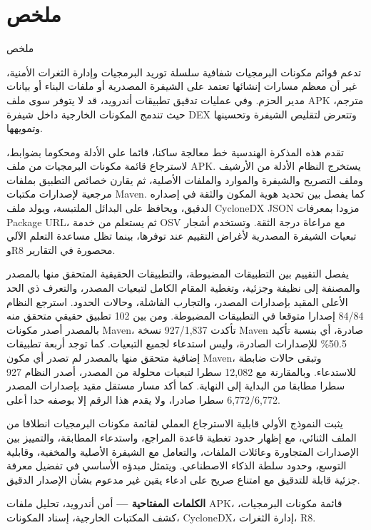 \chapter*{\texorpdfstring{\textarabic{ملخص}}{Arabic Abstract}}
  {\texorpdfstring{\textarabic{ملخص}}{Arabic Abstract}}

\begin{otherlanguage}{arabic}
تدعم قوائم مكونات البرمجيات شفافية سلسلة توريد البرمجيات وإدارة الثغرات
الأمنية، غير أن معظم مسارات إنشائها تعتمد على الشيفرة المصدرية أو ملفات
البناء أو بيانات مدير الحزم. وفي عمليات تدقيق تطبيقات أندرويد، قد لا يتوفر
سوى ملف \textenglish{APK} مترجم، حيث تندمج المكونات الخارجية داخل شيفرة
\textenglish{DEX} وتتعرض لتقليص الشيفرة وتحسينها وتمويهها.

تقدم هذه المذكرة الهندسية خط معالجة ساكنا، قائما على الأدلة ومحكوما بضوابط،
لاسترجاع قائمة مكونات البرمجيات من ملف \textenglish{APK}. يستخرج النظام
الأدلة من الأرشيف وملف التصريح والشيفرة والموارد والملفات الأصلية، ثم يقارن
خصائص التطبيق بملفات مرجعية لإصدارات مكتبات \textenglish{Maven}. كما يفصل
بين تحديد هوية المكون والثقة في إصداره الدقيق، ويحافظ على البدائل الملتبسة،
ويولد ملف \textenglish{CycloneDX JSON} مزودا بمعرفات
\textenglish{Package URL}، ثم يستعلم من خدمة \textenglish{OSV} مع مراعاة
درجة الثقة. وتستخدم أشجار تبعيات الشيفرة المصدرية لأغراض التقييم عند
توفرها، بينما تظل مساعدة التعلم الآلي و\textenglish{R8} محصورة في التقارير.

يفصل التقييم بين التطبيقات المضبوطة، والتطبيقات الحقيقية المتحقق منها
بالمصدر والمصنفة إلى نظيفة وجزئية، وتغطية المقام الكامل لتبعيات المصدر،
والتعرف ذي الحد الأعلى المقيد بإصدارات المصدر، والتجارب الفاشلة، وحالات
الحدود. استرجع النظام 84/84 إصدارا متوقعا في التطبيقات المضبوطة. ومن بين
102 تطبيق حقيقي متحقق منه بالمصدر أصدر مكونات \textenglish{Maven}، تأكدت 927/1,837 نسخة
\textenglish{Maven} صادرة، أي بنسبة تأكيد 50.5\% للإصدارات الصادرة، وليس
استدعاء لجميع التبعيات. كما توجد أربعة تطبيقات إضافية متحقق منها بالمصدر لم
تصدر أي مكون \textenglish{Maven}، وتبقى حالات ضابطة للاستدعاء. وبالمقارنة مع
12,082 سطرا لتبعيات محلولة من المصدر،
أصدر النظام 927 سطرا مطابقا من البداية إلى النهاية. كما أكد مسار مستقل مقيد
بإصدارات المصدر 6,772/6,772 سطرا صادرا، ولا يقدم هذا الرقم إلا بوصفه حدا
أعلى.

يثبت النموذج الأولي قابلية الاسترجاع العملي لقائمة مكونات البرمجيات انطلاقا
من الملف الثنائي، مع إظهار حدود تغطية قاعدة المراجع، واستدعاء المطابقة،
والتمييز بين الإصدارات المتجاورة وعائلات الملفات، والتعامل مع الشيفرة
الأصلية والمخفية، وقابلية التوسع، وحدود سلطة الذكاء الاصطناعي. ويتمثل مبدؤه
الأساسي في تفضيل معرفة جزئية قابلة للتدقيق مع امتناع صريح على ادعاء يقين غير
مدعوم بشأن الإصدار الدقيق.

\vspace{0.5cm}
\noindent\textbf{الكلمات المفتاحية ---}
أمن أندرويد، تحليل ملفات \textenglish{APK}، قائمة مكونات البرمجيات، كشف
المكتبات الخارجية، إسناد المكونات، \textenglish{CycloneDX}، إدارة الثغرات،
\textenglish{R8}.
\end{otherlanguage}
